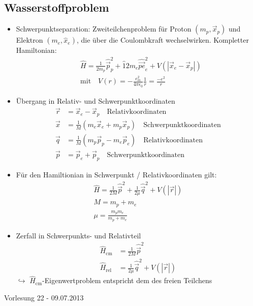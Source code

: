 \documentclass[10pt,article,colorback,accentcolor=tud9d]{scrartcl}
\begin{document}
\subsection{Wasserstoffproblem}
\begin{itemize}
  \item Schwerpunktseparation: Zweiteilchenproblem für Proton $(m_p,\vec{x}_p)$ und Elektron $(m_e,\hat{x}_e)$, die über die Coulombkraft wechselwirken. Kompletter Hamiltonian:
  \begin{align}
  &\hat{H}=\frac{1}{2m_p}\hat{\vec{p}}_p^2+\hat{1}{2m_e}\hat{\vec{pe}}_e^2+V(|\vec{x}_e-\vec{x}_p|)\\
  &\text{mit}\quad V(r)=-\frac{e_m^2}{4\pi\epsilon_0}\frac{1}{r}=\frac{-e^2}{r}
  \end{align}
  \item Übergang in Relativ- und Schwerpunktkoordinaten
    \begin{align}
    \vec{r}&=\vec{x}_e-\vec{x}_p\quad\text{Relativkoordinaten}\\
    \vec{x}&=\frac{1}{M}(m_e\vec{x}_e+m_p\vec{x}_p)\quad\text{Schwerpunktkoordinaten}\\
    \vec{q}&=\frac{1}{M}(m_p\vec{p}_p-m_e\vec{p}_e)\quad\text{Relativkoordinaten}\\
    \vec{p}&=\vec{p}_e+\vec{p}_p\quad\text{Schwerpunktkoordinaten}
    \end{align}
  \item Für den Hamiltionian in Schwerpunkt / Relativkoordinaten gilt:
    \begin{align}
    \hat{H}=\frac{1}{2M}\hat{\vec{p}}^2+\frac{1}{2\mu}\hat{\vec{q}}^2+V(|\vec{r}|)\\
    M=m_p+m_e\\
    \mu=\frac{m_pm_e}{m_p+m_e}
    \end{align}
  \item Zerfall in Schwerpunkts- und Relativteil
    \begin{align}
    \hat{H}_\text{cm}&=\frac{1}{2M}\hat{\vec{p}}^2\\
    \hat{H}_\text{rel}&=\frac{1}{2\mu}\hat{\vec{q}}^2+V(|\vec{r}|)
    \end{align}
    $\hookrightarrow$ $\hat{H}_\text{cm}$-Eigenwertproblem entspricht dem des freien Teilchens
\end{itemize}


\begin{flushright}
Vorlesung 22 - 09.07.2013
\end{flushright}
\end{document}
